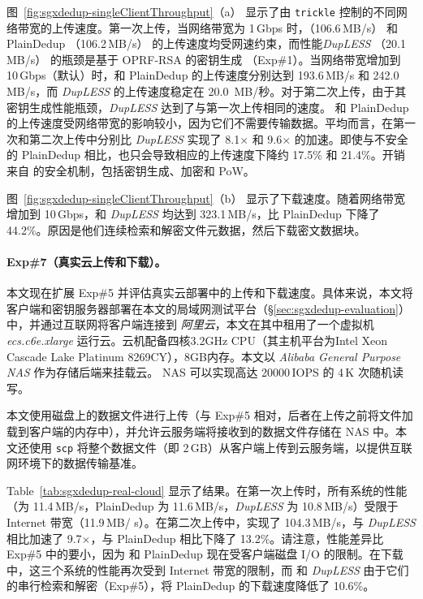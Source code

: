 图~\ref{fig:sgxdedup-singleClientThroughput}（a） 显示了由 {\tt trickle} \cite{eriksen05} 控制的不同网络带宽的上传速度。第一次上传，当网络带宽为 1\,Gbps 时，\sysnameS （106.6\,MB/s） 和 PlainDedup （106.2\,MB/s） 的上传速度均受网速约束，而性能{\em DupLESS} （20.1\,MB/s） 的瓶颈是基于 OPRF-RSA 的密钥生成 （Exp\#1）。当网络带宽增加到 10\,Gbps（默认）时，\sysnameS 和 PlainDedup 的上传速度分别达到 193.6\,MB/s 和 242.0\,MB/s，而 {\em DupLESS} 的上传速度稳定在 20.0\, MB/秒。对于第二次上传，由于其密钥生成性能瓶颈，{\em DupLESS} 达到了与第一次上传相同的速度。 \sysnameS 和 PlainDedup 的上传速度受网络带宽的影响较小，因为它们不需要传输数据。平均而言，\sysnameS 在第一次和第二次上传中分别比 {\em DupLESS} 实现了 8.1$\times$ 和 9.6$\times$ 的加速。即使与不安全的 PlainDedup 相比，\sysnameS 也只会导致相应的上传速度下降约 17.5\% 和 21.4\%。开销来自 \sysnameS 的安全机制，包括密钥生成、加密和 PoW。

图~\ref{fig:sgxdedup-singleClientThroughput}（b） 显示了下载速度。随着网络带宽增加到 10\,Gbps，\sysnameS 和 {\em DupLESS} 均达到 323.1\,MB/s，比 PlainDedup 下降了 44.2\%。原因是他们连续检索和解密文件元数据，然后下载密文数据块。

\paragraph*{Exp\#7（真实云上传和下载）。} 本文现在扩展 Exp\#5 并评估真实云部署中的上传和下载速度。具体来说，本文将客户端和密钥服务器部署在本文的局域网测试平台（\S\ref{sec:sgxdedup-evaluation}）中，并通过互联网将客户端连接到\textit{ 阿里云}，本文在其中租用了一个虚拟机\textit{ ecs.c6e.xlarge} 运行云。云机配备四核3.2GHz CPU（其主机平台为Intel Xeon Cascade Lake Platinum 8269CY），8GB内存。本文以 \textit{ Alibaba General Purpose NAS} 作为存储后端来挂载云。 NAS 可以实现高达 20000\,IOPS 的 4\,K 次随机读写。

本文使用磁盘上的数据文件进行上传（与 Exp\#5 相对，后者在上传之前将文件加载到客户端的内存中），并允许云服务端将接收到的数据文件存储在 NAS 中。本文还使用 {\tt scp} 将整个数据文件（即 2\,GB）从客户端上传到云服务端，以提供互联网环境下的数据传输基准。


Table~\ref{tab:sgxdedup-real-cloud} 显示了结果。在第一次上传时，所有系统的性能（\sysnameS 为 11.4\,MB/s，PlainDedup 为 11.6\,MB/s，{\em DupLESS} 为 10.8\,MB/s）受限于 Internet 带宽（11.9\,MB/ s）。在第二次上传中，\sysnameS 实现了 104.3\,MB/s，与 {\em DupLESS} 相比加速了 9.7$\times$，与 PlainDedup 相比下降了 13.2\%。请注意，性能差异比 Exp\#5 中的要小，因为 \sysnameS 和 PlainDedup 现在受客户端磁盘 I/O 的限制。在下载中，这三个系统的性能再次受到 Internet 带宽的限制，而 \sysnameS 和 {\em DupLESS} 由于它们的串行检索和解密（Exp\#5），将 PlainDedup 的下载速度降低了 10.6\%。


